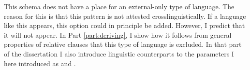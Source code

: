 This schema does not have a place for an external-only type of language. The reason for this is that this pattern is not attested crosslinguistically. If a language like this appears, this option could in principle be added. However, I predict that it will not appear. In Part \ref{part:deriving}, I show how it follows from general properties of relative clauses that this type of language is excluded. In that part of the dissertation I also introduce linguistic counterparts to the parameters I here introduced as  and .
